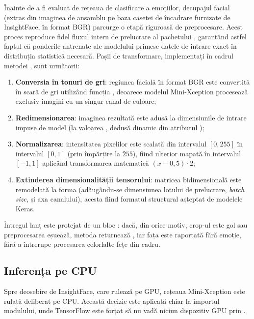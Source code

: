 \documentclass[../../main.tex]{subfiles}
\begin{document}
Înainte de a fi evaluat de rețeaua de clasificare a emoțiilor, decupajul facial (extras din imaginea de ansamblu pe baza casetei de încadrare furnizate de InsightFace, în format BGR) parcurge o etapă riguroasă de preprocesare. Acest proces reproduce fidel fluxul intern de prelucrare al pachetului , garantând astfel faptul că ponderile antrenate ale modelului primesc datele de intrare exact în distribuția statistică necesară. Pașii de transformare, implementați în cadrul metodei , sunt următorii:

\begin{enumerate}
	\item \textbf{Conversia în tonuri de gri}: regiunea facială în format BGR este convertită în scară de gri utilizând funcția , deoarece modelul Mini-Xception procesează exclusiv imagini cu un singur canal de culoare;
	\item \textbf{Redimensionarea}: imaginea rezultată este adusă la dimensiunile de intrare impuse de model (la valoarea , dedusă dinamic din atributul );
	\item \textbf{Normalizarea}: intensitatea pixelilor este scalată din intervalul $[0, 255]$ în intervalul $[0, 1]$ (prin împărțire la $255$), fiind ulterior mapată în intervalul $[-1, 1]$ aplicând transformarea matematică $(x - 0{,}5) \cdot 2$;
	\item \textbf{Extinderea dimensionalității tensorului}: matricea bidimensională este remodelată la forma  (adăugându-se dimensiunea lotului de prelucrare, \emph{batch size}, și axa canalului), acesta fiind formatul structural așteptat de modelele Keras.
\end{enumerate}

Întregul lanț este protejat de un bloc : dacă, din orice motiv,
crop-ul este gol sau preprocesarea eșuează, metoda returnează , iar
fața este raportată fără emoție, fără a întrerupe procesarea celorlalte fețe din cadru.

\subsection{Inferența pe CPU}
\label{subsec:inferenta_cpu}

Spre deosebire de InsightFace, care rulează pe GPU, rețeaua Mini-Xception este rulată
deliberat pe CPU. Această decizie este aplicată chiar la importul modulului, unde
TensorFlow este forțat să nu vadă niciun dispozitiv GPU prin
.
\end{document}
